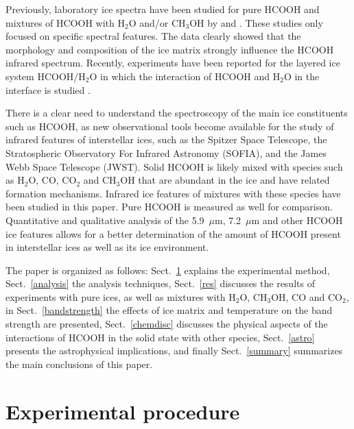 \documentclass{aa}
\begin{document}
Previously, laboratory ice spectra have been studied for pure HCOOH
and mixtures of HCOOH with H$_2$O and/or CH$_3$OH by
\citet{schutte1999} and \citet{hudson1999}. These studies only focused
on specific spectral features. The data clearly showed that the
morphology and composition of the ice matrix strongly influence the
HCOOH infrared spectrum. Recently, experiments have been reported for
the layered ice system HCOOH/H$_2$O in which the interaction of HCOOH
and H$_2$O in the interface is studied \citep[see
e.g.,][]{cyriac2005,bahr2005,souda2006}.

There is a clear need to understand the spectroscopy of the main ice
constituents such as HCOOH, as new observational tools become
available for the study of infrared features of interstellar ices,
such as the Spitzer Space Telescope, the Stratospheric Observatory For
Infrared Astronomy (SOFIA), and the James Webb Space Telescope
(JWST). Solid HCOOH is likely mixed with species such as H$_2$O, CO,
CO$_2$ and CH$_3$OH that are abundant in the ice and have related
formation mechanisms. Infrared ice features of mixtures with these
species have been studied in this paper. Pure HCOOH is measured as
well for comparison. Quantitative and qualitative analysis of the
5.9~$\mu$m, 7.2~$\mu$m and other HCOOH ice features allows for a
better determination of the amount of HCOOH present in interstellar
ices as well as its ice environment.

The paper is organized as follows: Sect.~\ref{exp_method} explains the
experimental method, Sect.~\ref{analysis} the analysis techniques,
Sect.~\ref{res} discusses the results of experiments with pure ices,
as well as mixtures with H$_2$O, CH$_3$OH, CO and CO$_2$, in
Sect.~\ref{bandstrength} the effects of ice matrix and temperature on
the band strength are presented, Sect.~\ref{chemdisc} discusses the
physical aspects of the interactions of HCOOH in the solid state with
other species, Sect.~\ref{astro} presents the astrophysical
implications, and finally Sect.~\ref{summary} summarizes the main
conclusions of this paper.

\section{Experimental procedure}\label{exp_method}
\end{document}
